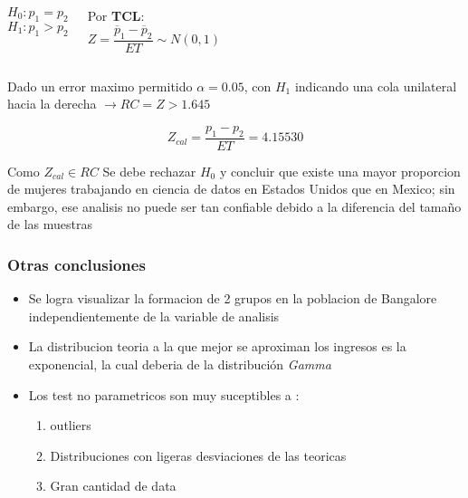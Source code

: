 \documentclass{beamer}
\begin{document}
\begin{frame}

  \begin{columns}
   \[H_0: p_1 = p_2\]
   \[H_1: p_1 > p_2\]


    Por \textbf{TCL}:
      \[\textit{Z} = \frac{\overline{p}_1 - \overline{p}_2}{ET} \sim N(0, 1)\]
      \newline

  \end{columns}

  Dado un error maximo permitido $\alpha = 0.05$, con \textit{$H_1$} indicando una cola unilateral
  hacia la derecha $\rightarrow RC = {Z > 1.645}$

  \[Z_{cal} = \frac{p_1 - p_2}{ET} = 4.15530\]

  Como \textit{$Z_{cal} \in RC$} Se debe rechazar \textit{$H_0$} y concluir que
  existe una mayor proporcion de mujeres trabajando en ciencia de datos en Estados
  Unidos que en Mexico; sin embargo, ese analisis no puede ser tan confiable debido
  a la diferencia del tamaño de las muestras

\end{frame}

\begin{frame}

  \frametitle{Otras conclusiones}

  \begin{itemize}
    \item Se logra visualizar la formacion de 2 grupos en la poblacion
      de Bangalore independientemente de la variable de analisis

    \item La distribucion teoria a la que mejor se aproximan los ingresos
      es la exponencial, la cual deberia de la distribución \textit{Gamma}

    \item Los test no parametricos son muy suceptibles a :
      \begin{enumerate}
        \item outliers
        \item Distribuciones con ligeras desviaciones de las teoricas
        \item Gran cantidad de data
      \end{enumerate}
  \end{itemize}


\end{frame}
\end{document}
